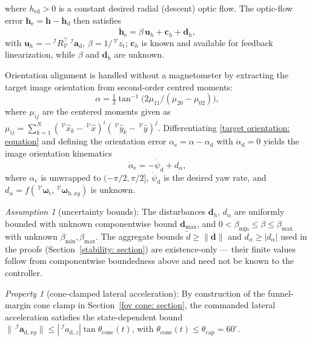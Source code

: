 where $h_\text{rd}>0$ is a constant desired radial (descent) optic flow. The optic-flow error $\boldsymbol{h}_\text{e}=\boldsymbol{h}-\boldsymbol{h}_\text{d}$ then satisfies
\begin{equation} \label{h_e_dot_1: equation}
    \dot{\boldsymbol{h}}_\text{e} = \beta\,\boldsymbol{u}_h + \boldsymbol{c}_h + \boldsymbol{d}_h,
\end{equation}
with $\boldsymbol{u}_h=-\,^\mathcal{I}R_\mathcal{V}^\top\,^\mathcal{I}\boldsymbol{a}_\text{d}$, $\beta=1/\,^\mathcal{V}z_\text{t}$; $\boldsymbol{c}_h$ is known and available for feedback linearization, while $\beta$ and $\boldsymbol{d}_h$ are unknown.

Orientation alignment is handled without a magnetometer by extracting the target image orientation from second-order centred moments:
\begin{equation} \label{target orientation: equation}
    \alpha = \tfrac12\tan^{-1}\!\big(2\mu_{11}/(\mu_{20}-\mu_{02})\big),
\end{equation}
where $\mu_{ij}$ are the centered moments given as $\mu_{ij} = \sum^{N}_{k=1} (\,^\mathcal{V}\hat{x}_k - \,^\mathcal{V}\hat{x})^i (\,^\mathcal{V}\hat{y}_k - \,^\mathcal{V}\hat{y})^j$.
Differentiating \eqref{target orientation: equation} and defining the orientation error $\alpha_\text{e}=\alpha-\alpha_\text{d}$ with $\dot{\alpha}_\text{d}=0$ yields the image orientation kinematics
\begin{equation} \label{alpha_e_dot: equation}
    \dot{\alpha}_\text{e} = - \dot{\psi}_\text{d} + d_{\alpha},
\end{equation}
where $\alpha_e$ is unwrapped to $(-\pi/2,\pi/2]$, $\dot{\psi}_\text{d}$ is the desired yaw rate, and $d_{\alpha} = f(\,^\mathcal{V}\boldsymbol{\omega}_{\text{t}}, \,^\mathcal{V}\boldsymbol{\omega}_{\text{b},xy})$ is unknown.

\textit{Assumption 1} (uncertainty bounds): The disturbances $\boldsymbol{d}_h$, $d_{\alpha}$ are uniformly bounded with unknown componentwise bound $\boldsymbol{d}_{\max}$, and $0<\beta_{\min}\le\beta\le\beta_{\max}$ with unknown $\beta_{\min},\beta_{\max}$. The aggregate bounds $\tilde{d}\ge\|\boldsymbol{\overline{d}}\|$ and $\tilde{d}_\alpha\ge|d_\alpha|$ used in the proofs (Section~\ref{stability: section}) are existence-only --- their finite values follow from componentwise boundedness above and need not be known to the controller.

\textit{Property 1} (cone-clamped lateral acceleration): By construction of the funnel-margin cone clamp in Section~\ref{fov cone: section}, the commanded lateral acceleration satisfies the state-dependent bound $\|\,^\mathcal{I}\boldsymbol{a}_{\text{d},xy}\|\le|\,^\mathcal{I}a_{\text{d},z}|\tan\theta_\text{cone}(t)$, with $\theta_\text{cone}(t)\le\theta_\text{cap}=60^\circ$.

